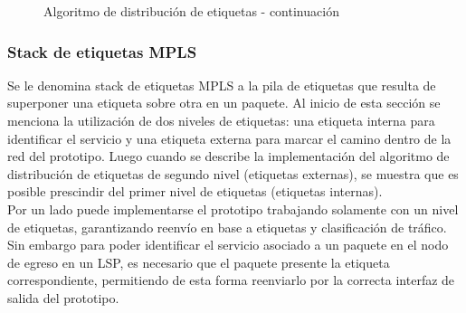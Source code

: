 \newpage
\begin{figure}[ht!]
\begin{algorithm}[H]
\end{algorithm}
\caption[]{Algoritmo de distribución de etiquetas - continuación}
\end{figure}

\subsubsection{Stack de etiquetas MPLS}
Se le denomina stack de etiquetas MPLS a la pila de etiquetas que resulta de superponer una etiqueta sobre otra en un paquete. Al inicio de esta secci\'on se menciona la utilizaci\'on de dos niveles de etiquetas: una etiqueta interna para identificar el servicio y una etiqueta externa para marcar el camino dentro de la red del prototipo. Luego cuando se describe la implementaci\'on del algoritmo de distribución de etiquetas de segundo nivel (etiquetas externas), se muestra que es posible prescindir del primer nivel de etiquetas (etiquetas internas).\\

Por un lado puede implementarse el prototipo trabajando solamente con un nivel de etiquetas, garantizando reenvío en base a etiquetas y clasificaci\'on de tr\'afico. Sin embargo para poder identificar el servicio asociado a un paquete en el nodo de egreso en un LSP, es necesario que el paquete presente la etiqueta correspondiente, permitiendo de esta forma reenviarlo por la correcta interfaz de salida del prototipo. 

